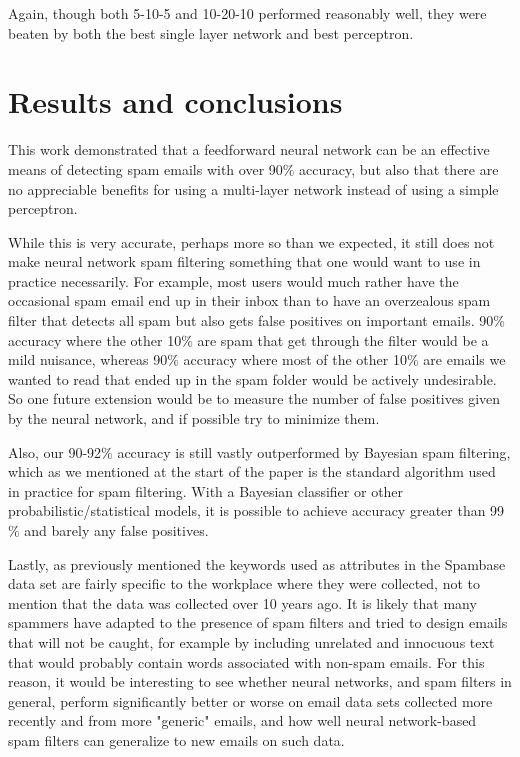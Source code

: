 \documentclass[11pt]{article} %
\begin{document}
\bigskip
Again, though both 5-10-5 and 10-20-10 performed reasonably well, they were beaten by both the best single layer network and best perceptron.

\section{Results and conclusions}

This work demonstrated that a feedforward neural network can be an effective means of detecting spam emails with over 90$\%$ accuracy, but also that there are no appreciable benefits for using a multi-layer network instead of using a simple perceptron.

While this is very accurate, perhaps more so than we expected, it still does not make neural network spam filtering something that one would want to use in practice necessarily. For example, most users would much rather have the occasional spam email end up in their inbox than to have an overzealous spam filter that detects all spam but also gets false positives on important emails. 90$\%$ accuracy where the other 10$\%$ are spam that get through the filter would be a mild nuisance, whereas 90$\%$ accuracy where most of the other 10$\%$ are emails we wanted to read that ended up in the spam folder would be actively undesirable. So one future extension would be to measure the number of false positives given by the neural network, and if possible try to minimize them.

Also, our 90-92$\%$ accuracy is still vastly outperformed by Bayesian spam filtering, which as we mentioned at the start of the paper is the standard algorithm used in practice for spam filtering. With a Bayesian classifier or other probabilistic/statistical models, it is possible to achieve accuracy greater than 99$\%$ and barely any false positives.

Lastly, as previously mentioned the keywords used as attributes in the Spambase data set are fairly specific to the workplace where they were collected, not to mention that the data was collected over 10 years ago. It is likely that many spammers have adapted to the presence of spam filters and tried to design emails that will not be caught, for example by including unrelated and innocuous text that would probably contain words associated with non-spam emails. For this reason, it would be interesting to see whether neural networks, and spam filters in general, perform significantly better or worse on email data sets collected more recently and from more "generic" emails, and how well neural network-based spam filters can generalize to new emails on such data.
\end{document}
